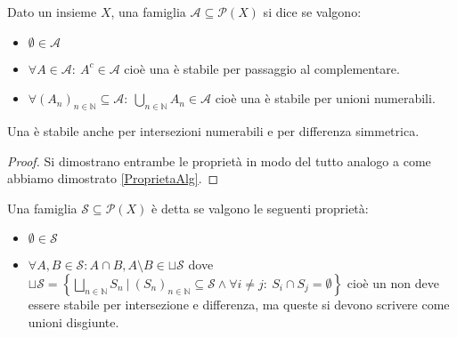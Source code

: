 \begin{definition}[\sigalg{}]
	Dato un insieme $X$, una famiglia $\mathcal A\subseteq\mathcal P (X)$ si dice \sigalg{} se valgono:
	\begin{itemize}
	\item $\emptyset\in \mathcal A$
	\item $\forall A\in \mathcal A:\ A^c\in \mathcal A$ cioè una \sigalg{} è stabile per passaggio al complementare.
	\item $\forall (A_n)_{n\in\mathbb N}\subseteq \mathcal A:\ \bigcup_{n\in\mathbb N} A_n\in \mathcal A$ cioè una \sigalg{} è stabile per unioni numerabili.  
	\end{itemize}
\end{definition}

\begin{remark}\label{ProprietaSigAlg}
	Una \sigalg{} è stabile anche per intersezioni numerabili e per differenza simmetrica.
\end{remark}
\begin{proof}
	Si dimostrano entrambe le proprietà in modo del tutto analogo a come abbiamo dimostrato \cref{ProprietaAlg}.
\end{proof}

\begin{definition}[\Semiring{}]
	Una famiglia $\mathcal S\subseteq \mathcal P(X)$ è detta \semiring{} se valgono le seguenti proprietà:
	\begin{itemize}
		\item $\emptyset\in \mathcal S$
		\item $\displaystyle\forall A,B\in \mathcal S: A\cap B, A\setminus B\in \sqcup \mathcal S$ dove
		$\displaystyle
		\sqcup{ \mathcal S }=\left\{\bigsqcup_{n\in \mathbb N} S_n\ |\ (S_n)_{n\in\mathbb N} \subseteq \mathcal S \wedge \forall i\not= j:\ S_i\cap S_j=\emptyset\right\}$ 
		cioè un \semiring{} non deve essere stabile per intersezione e differenza, ma queste si devono scrivere come unioni disgiunte.
	\end{itemize}
\end{definition}

